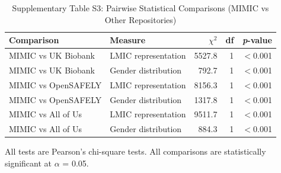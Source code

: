 \begin{table}[htbp]
\centering
\caption{Supplementary Table S3: Pairwise Statistical Comparisons (MIMIC vs Other Repositories)}
\label{tab:statistics}
\begin{tabular}{llrrr}
\toprule
Comparison & Measure & $\chi^2$ & df & \textit{p}-value \\
\midrule
MIMIC vs UK Biobank & LMIC representation & 5527.8 & 1 & $<$0.001 \\
MIMIC vs UK Biobank & Gender distribution & 792.7 & 1 & $<$0.001 \\
\addlinespace
MIMIC vs OpenSAFELY & LMIC representation & 8156.3 & 1 & $<$0.001 \\
MIMIC vs OpenSAFELY & Gender distribution & 1317.8 & 1 & $<$0.001 \\
\addlinespace
MIMIC vs All of Us & LMIC representation & 9511.7 & 1 & $<$0.001 \\
MIMIC vs All of Us & Gender distribution & 884.3 & 1 & $<$0.001 \\
\bottomrule
\end{tabular}

\smallskip
\footnotesize
All tests are Pearson's chi-square tests. All comparisons are statistically significant at $\alpha$ = 0.05.
\end{table}



